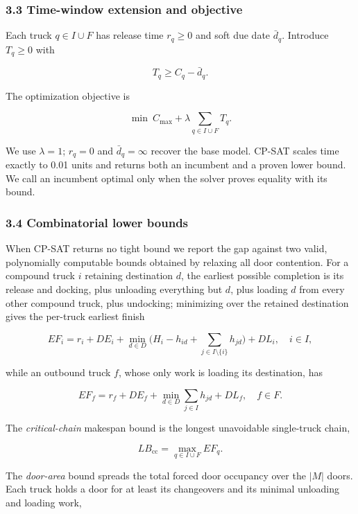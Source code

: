 \documentclass[
]{article}
\begin{document}
\subsubsection{3.3 Time-window extension and
objective}\label{time-window-extension-and-objective}

Each truck \(q\in I\cup F\) has release time \(r_q\ge0\) and soft due
date \(\bar d_q\). Introduce \(T_q\ge0\) with

\[
T_q\ge C_q-\bar d_q. \tag{15}
\]

The optimization objective is

\[
\min\ C_{\max}+\lambda\sum_{q\in I\cup F}T_q. \tag{16}
\]

We use \(\lambda=1\); \(r_q=0\) and \(\bar d_q=\infty\) recover the base
model. CP-SAT scales time exactly to 0.01 units and returns both an
incumbent and a proven lower bound. We call an incumbent optimal only
when the solver proves equality with its bound.

\subsubsection{3.4 Combinatorial lower
bounds}\label{combinatorial-lower-bounds}

When CP-SAT returns no tight bound we report the gap against two valid,
polynomially computable bounds obtained by relaxing all door contention.
For a compound truck \(i\) retaining destination \(d\), the earliest
possible completion is its release and docking, plus unloading
everything but \(d\), plus loading \(d\) from every other compound
truck, plus undocking; minimizing over the retained destination gives
the per-truck earliest finish

\[
EF_i=r_i+DE_i+\min_{d\in D}\Big(H_i-h_{id}+\sum_{j\in I\setminus\{i\}}h_{jd}\Big)+DL_i,\quad i\in I, \tag{18}
\]

while an outbound truck \(f\), whose only work is loading its
destination, has

\[
EF_f=r_f+DE_f+\min_{d\in D}\sum_{j\in I}h_{jd}+DL_f,\quad f\in F. \tag{19}
\]

The \emph{critical-chain} makespan bound is the longest unavoidable
single-truck chain,

\[
LB_{\mathrm{cc}}=\max_{q\in I\cup F}EF_q. \tag{20}
\]

The \emph{door-area} bound spreads the total forced door occupancy over
the \(|M|\) doors. Each truck holds a door for at least its changeovers
and its minimal unloading and loading work,
\end{document}

